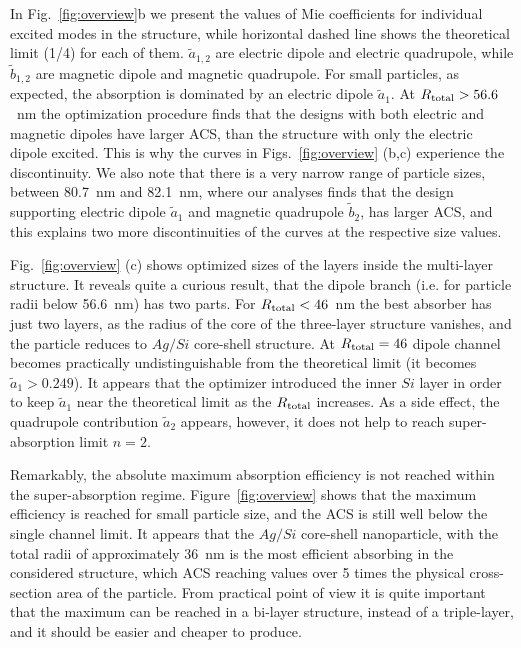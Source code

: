 \documentclass[aps,prl,twocolumn,showpacs,superscriptaddress,groupedaddress]{revtex4-1}
\begin{document}
In Fig.~\ref{fig:overview}b we present the values of Mie coefficients
for individual excited modes in the structure, while horizontal dashed
line shows the theoretical limit (1/4) for each of
them. $\tilde{a}_{1,2}$ are electric dipole and electric quadrupole,
while $\tilde{b}_{1,2}$ are magnetic dipole and magnetic
quadrupole. For small particles, as expected, the absorption is
dominated by an electric dipole $\tilde{a}_1$.  At $R_{\rm total} >
56.6$~nm the optimization procedure finds that the designs with both
electric and magnetic dipoles have larger ACS, than the structure with
only the electric dipole excited. This is why the curves in
Figs.~\ref{fig:overview} (b,c) experience the discontinuity. We also
note that there is a very narrow range of particle sizes, between
80.7~nm and 82.1~nm, where our analyses finds that the design
supporting electric dipole $\tilde{a}_1$ and magnetic quadrupole
$\tilde{b}_2$, has larger ACS, and this explains two more
discontinuities of the curves at the respective size values.

Fig.~\ref{fig:overview} (c) shows optimized sizes of the layers inside
the multi-layer structure. It reveals quite a curious result, that the
dipole branch (i.e. for particle radii below 56.6~nm) has two
parts. For $R_{\rm total}<46$~nm the best absorber has just two
layers, as the radius of the core of the three-layer structure
vanishes, and the particle reduces to $Ag/Si$ core-shell structure.
At $R_{\rm total}=46$ dipole channel becomes practically
undistinguishable from the theoretical limit (it becomes
$\tilde{a}_1>0.249$).  It appears that the optimizer introduced the
inner $Si$ layer in order to keep $\tilde{a}_1$ near the theoretical
limit as the $R_{\rm total}$ increases.  As a side effect, the
quadrupole contribution $\tilde{a}_2$ appears, however, it does not
help to reach super-absorption limit $n=2$.

Remarkably, the absolute maximum absorption efficiency is not reached
within the super-absorption regime. Figure~\ref{fig:overview} shows
that the maximum efficiency is reached for small particle size, and
the ACS is still well below the single channel limit. It appears that
the $Ag/Si$ core-shell nanoparticle, with the total radii of
approximately 36~nm is the most efficient absorbing in the considered
structure, which ACS reaching values over 5 times the physical
cross-section area of the particle.  From practical point of view it
is quite important that the maximum can be reached in a bi-layer
structure, instead of a triple-layer, and it should be easier and
cheaper to produce.
\end{document}

